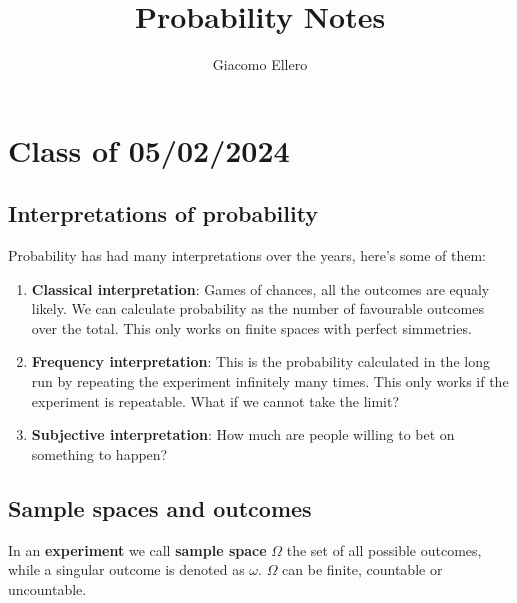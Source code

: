 \documentclass[10pt]{extarticle}
\title{Probability Notes}
\author{Giacomo Ellero}
\begin{document}
\maketitle
\tableofcontents
\clearpage

\section{Class of 05/02/2024}

\subsection{Interpretations of probability}

Probability has had many interpretations over the years, here's some of them:
\begin{enumerate}
    \item \textbf{Classical interpretation}: Games of chances, all the outcomes are equaly likely.
          We can calculate probability as the number of favourable outcomes over the total.
          This only works on finite spaces with perfect simmetries.
    \item \textbf{Frequency interpretation}: This is the probability calculated in the long run by repeating the experiment infinitely many times.
          This only works if the experiment is repeatable. What if we cannot take the limit?
    \item \textbf{Subjective interpretation}: How much are people willing to bet on something to happen?
\end{enumerate}

\subsection{Sample spaces and outcomes}

In an \textbf{experiment} we call \textbf{sample space} $\Omega$ the set of all possible outcomes,
while a singular outcome is denoted as $\omega$.
$\Omega$ can be finite, countable or uncountable.
\end{document}
